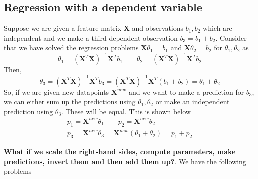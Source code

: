 \documentclass{article}
\newcommand{\beq}{\begin{equation}}
\newcommand{\eeq}{\end{equation}}
\newcommand{\ber}{\begin{eqnarray}}
\newcommand{\eer}{\end{eqnarray}}
\begin{document}
\subsection{Regression with a dependent variable}
Suppose we are given a feature matrix $\pmb{X}$ and observations $b_1,b_2$ which are independent and we make a third dependent observation $b_3=b_1+b_2$. Consider that we have solved the regression problems $\pmb{X}\theta_1=b_1$ and $\pmb{X}\theta_2=b_2$ for $\theta_1,\theta_2$ as
\beq
\theta_1 = (\pmb{X}^T\pmb{X})^{-1}\pmb{X}^Tb_1 \qquad \theta_2 = (\pmb{X}^T\pmb{X})^{-1}\pmb{X}^Tb_2
\eeq
Then,
\beq
\theta_3 = (\pmb{X}^T\pmb{X})^{-1}\pmb{X}^Tb_3 =(\pmb{X}^T\pmb{X})^{-1}\pmb{X}^T(b_1+b_2)  = \theta_1 + \theta_2
\eeq
So, if we are given new datapoints $\pmb{X}^{new}$ and we want to make a prediction for $b_3$, we can either sum up the predictions using $\theta_1,\theta_2$ or make an independent prediction using $\theta_3$. These will be equal. This is shown below
\ber
p_1 = \pmb{X}^{new}\theta_1 \qquad p_2 = \pmb{X}^{new}\theta_2\\
p_3 = \pmb{X}^{new}\theta_3 = \pmb{X}^{new}(\theta_1+\theta_2) = p_1 + p_2
\eer

\textbf{What if we scale the right-hand sides, compute parameters, make predictions, invert them and then add them up?}.  We have the following problems
\end{document}
